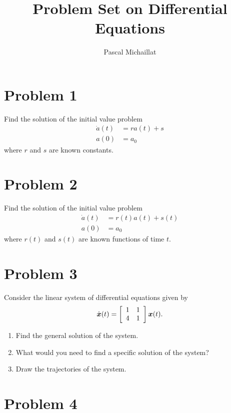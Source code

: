 \documentclass[letterpaper, 11pt, leqno]{article}
\begin{document}
\title{Problem Set on Differential Equations}
\author{Pascal Michaillat}
\date{}
\begin{titlepage}
\maketitle
\end{titlepage}

\section*{Problem 1}

Find the solution of the initial value problem 
\begin{align*}
\dot{a}(t) &=r a(t) +s \\
a(0) &=a_{0}
\end{align*}
where $r$ and $s$ are known constants.

\section*{Problem 2}

Find the solution of the initial value problem 
\begin{align*}
\dot{a}(t) &=r(t) a(t) +s(t) \\
a(0) &=a_{0}
\end{align*}
where $r(t)$ and $s(t)$ are known functions of time $t$.

\section*{Problem 3}

Consider the linear system of differential equations given by
\begin{equation*}
\dot{\bm{x}}(t)=\left[ 
\begin{array}{cc}
1 & 1 \\ 
4 & 1
\end{array} \right] \bm{x}(t).
\end{equation*}
\begin{enumerate}
\item Find the general solution of the system.
\item What would you need to find a specific solution of the system?
\item Draw the trajectories of the system.
\end{enumerate}

\section*{Problem 4}
\end{document}
